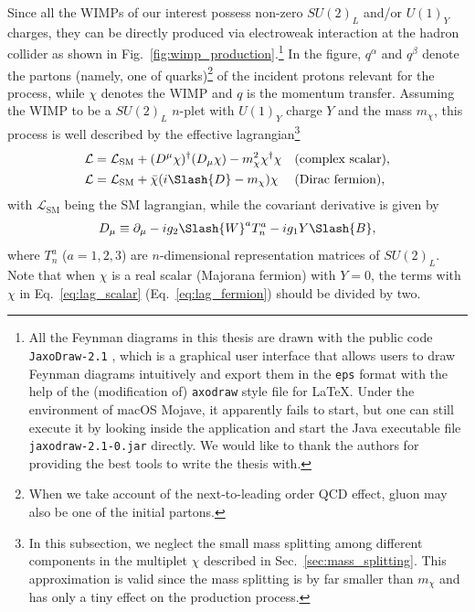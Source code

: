 \documentclass[12pt,twoside,book]{article}
\begin{document}
Since all the WIMPs of our interest possess non-zero $SU(2)_L$ and/or $U(1)_Y$ charges, they can be directly produced via electroweak interaction at the hadron collider as shown in Fig.~\ref{fig:wimp_production}.\footnote
{
  All the Feynman diagrams in this thesis are drawn with the public code \texttt{JaxoDraw-2.1} \cite{BINOSI20091709}, which is a graphical user interface that allows users to draw Feynman diagrams intuitively and export them in the \texttt{eps} format with the help of the (modification of) \texttt{axodraw} style file for \LaTeX \cite{VERMASEREN199445}.
  Under the environment of macOS Mojave, it apparently fails to start, but one can still execute it by looking inside the application and start the Java executable file \texttt{jaxodraw-2.1-0.jar} directly.
  We would like to thank the authors for providing the best tools to write the thesis with.
}
In the figure, $q^\alpha$ and $q^\beta$ denote the partons (namely, one of quarks)\footnote{
  When we take account of the next-to-leading order QCD effect, gluon may also be one of the initial partons.
}
of the incident protons relevant for the process, while $\chi$ denotes the WIMP and $q$ is the momentum transfer.
Assuming the WIMP to be a $SU(2)_L$ $n$-plet with $U(1)_Y$ charge $Y$ and the mass $m_\chi$, this process is well described by the effective lagrangian\footnote
{
  In this subsection, we neglect the small mass splitting among different components in the multiplet $\chi$ described in Sec.~\ref{sec:mass_splitting}.
  This approximation is valid since the mass splitting is by far smaller than $m_\chi$ and has only a tiny effect on the production process.
}
\begin{align}
  \mathcal{L} &= \mathcal{L}_{\mathrm{SM}} + (D^\mu \chi)^\dagger (D_\mu \chi) - m_\chi^2 \chi^\dagger \chi &
  &\text{(complex scalar)}, \label{eq:lag_scalar}\\
  \mathcal{L} &= \mathcal{L}_{\mathrm{SM}} + \bar{\chi} (i \Slash{D} - m_\chi) \chi &
  &\text{(Dirac fermion)}, \label{eq:lag_fermion}
\end{align}
with $\mathcal{L}_{\mathrm{SM}}$ being the SM lagrangian, while the covariant derivative is given by
\begin{align}
  D_\mu \equiv \partial_\mu - i g_2 \Slash{W}^a T_n^a - i g_1 Y \Slash{B},
\end{align}
where $T_n^a$ ($a=1,2,3$) are $n$-dimensional representation matrices of $SU(2)_L$.
Note that when $\chi$ is a real scalar (Majorana fermion) with $Y=0$, the terms with $\chi$ in Eq.~\eqref{eq:lag_scalar} (Eq.~\eqref{eq:lag_fermion}) should be divided by two.
\end{document}
